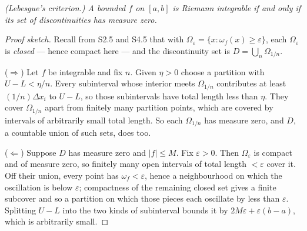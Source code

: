 \begin{center}
\end{center}

\emph{(Lebesgue's criterion.) A bounded $f$ on $[a,b]$ is Riemann integrable
if and only if its set of discontinuities has measure zero.}

\begin{proof}[Proof sketch]
Recall from S2.5 and S4.5 that with
$\Omega_\varepsilon = \{x : \omega_f(x) \ge \varepsilon\}$, each
$\Omega_\varepsilon$ is \emph{closed} --- hence compact here --- and the
discontinuity set is $D = \bigcup_n \Omega_{1/n}$.

($\Rightarrow$) Let $f$ be integrable and fix $n$. Given $\eta>0$ choose a
partition with $U-L < \eta/n$. Every subinterval whose interior meets
$\Omega_{1/n}$ contributes at least $(1/n)\Delta x_i$ to $U-L$, so those
subintervals have total length less than $\eta$. They cover
$\Omega_{1/n}$ apart from finitely many partition points, which are covered
by intervals of arbitrarily small total length. So each $\Omega_{1/n}$ has
measure zero, and $D$, a countable union of such sets, does too.

($\Leftarrow$) Suppose $D$ has measure zero and $|f| \le M$. Fix
$\varepsilon>0$. Then $\Omega_{\varepsilon}$ is compact and of measure zero,
so finitely many open intervals of total length $<\varepsilon$ cover it. Off
their union, every point has $\omega_f < \varepsilon$, hence a neighbourhood
on which the oscillation is below $\varepsilon$; compactness of the remaining
closed set gives a finite subcover and so a partition on which those pieces
each oscillate by less than $\varepsilon$. Splitting $U-L$ into the two kinds
of subinterval bounds it by $2M\varepsilon + \varepsilon(b-a)$, which is
arbitrarily small.
\end{proof}

